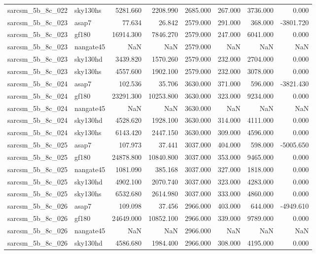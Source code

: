 \begin{tabular}{llrrrrrr}
sarcsm\_5b\_8c\_022 & sky130hs & 5281.660 & 2208.990 & 2685.000 & 267.000 & 3736.000 & 0.000 \\
sarcsm\_5b\_8c\_023 & asap7 & 77.634 & 26.842 & 2579.000 & 291.000 & 368.000 & -3801.720 \\
sarcsm\_5b\_8c\_023 & gf180 & 16914.300 & 7846.270 & 2579.000 & 247.000 & 6041.000 & 0.000 \\
sarcsm\_5b\_8c\_023 & nangate45 & NaN & NaN & 2579.000 & NaN & NaN & NaN \\
sarcsm\_5b\_8c\_023 & sky130hd & 3439.820 & 1570.260 & 2579.000 & 232.000 & 2704.000 & 0.000 \\
sarcsm\_5b\_8c\_023 & sky130hs & 4557.600 & 1902.100 & 2579.000 & 232.000 & 3078.000 & 0.000 \\
sarcsm\_5b\_8c\_024 & asap7 & 102.536 & 35.706 & 3630.000 & 371.000 & 596.000 & -3821.430 \\
sarcsm\_5b\_8c\_024 & gf180 & 23291.300 & 10253.800 & 3630.000 & 323.000 & 9234.000 & 0.000 \\
sarcsm\_5b\_8c\_024 & nangate45 & NaN & NaN & 3630.000 & NaN & NaN & NaN \\
sarcsm\_5b\_8c\_024 & sky130hd & 4528.620 & 1928.100 & 3630.000 & 314.000 & 4111.000 & 0.000 \\
sarcsm\_5b\_8c\_024 & sky130hs & 6143.420 & 2447.150 & 3630.000 & 309.000 & 4596.000 & 0.000 \\
sarcsm\_5b\_8c\_025 & asap7 & 107.973 & 37.441 & 3037.000 & 404.000 & 598.000 & -5005.650 \\
sarcsm\_5b\_8c\_025 & gf180 & 24878.800 & 10840.800 & 3037.000 & 353.000 & 9465.000 & 0.000 \\
sarcsm\_5b\_8c\_025 & nangate45 & 1081.090 & 385.168 & 3037.000 & 327.000 & 1818.000 & 0.000 \\
sarcsm\_5b\_8c\_025 & sky130hd & 4902.100 & 2070.740 & 3037.000 & 323.000 & 4283.000 & 0.000 \\
sarcsm\_5b\_8c\_025 & sky130hs & 6532.680 & 2614.980 & 3037.000 & 333.000 & 4860.000 & 0.000 \\
sarcsm\_5b\_8c\_026 & asap7 & 109.098 & 37.456 & 2966.000 & 403.000 & 644.000 & -4949.610 \\
sarcsm\_5b\_8c\_026 & gf180 & 24649.000 & 10852.100 & 2966.000 & 339.000 & 9789.000 & 0.000 \\
sarcsm\_5b\_8c\_026 & nangate45 & NaN & NaN & 2966.000 & NaN & NaN & NaN \\
sarcsm\_5b\_8c\_026 & sky130hd & 4586.680 & 1984.400 & 2966.000 & 308.000 & 4195.000 & 0.000 \\

\end{tabular}
